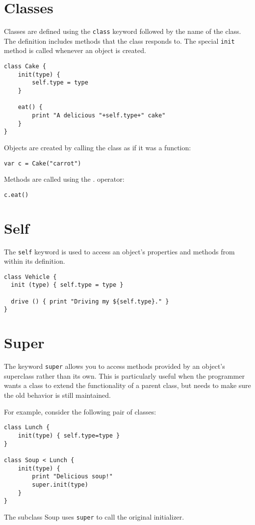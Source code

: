\hypertarget{classes}{%
\section{Classes}\label{classes}}

Classes are defined using the \texttt{class} keyword followed by the
name of the class. The definition includes methods that the class
responds to. The special \texttt{init} method is called whenever an
object is created.

\begin{lstlisting}
class Cake {
    init(type) {
        self.type = type
    }

    eat() {
        print "A delicious "+self.type+" cake"
    }
}
\end{lstlisting}

Objects are created by calling the class as if it was a function:

\begin{lstlisting}
var c = Cake("carrot")
\end{lstlisting}

Methods are called using the . operator:

\begin{lstlisting}
c.eat()
\end{lstlisting}

\hypertarget{self}{%
\section{Self}\label{self}}

The \texttt{self} keyword is used to access an object's properties and
methods from within its definition.

\begin{lstlisting}
class Vehicle {
  init (type) { self.type = type }

  drive () { print "Driving my ${self.type}." }
}
\end{lstlisting}

\hypertarget{super}{%
\section{Super}\label{super}}

The keyword \texttt{super} allows you to access methods provided by an
object's superclass rather than its own. This is particularly useful
when the programmer wants a class to extend the functionality of a
parent class, but needs to make sure the old behavior is still
maintained.

For example, consider the following pair of classes:

\begin{lstlisting}
class Lunch {
    init(type) { self.type=type }
}

class Soup < Lunch {
    init(type) {
        print "Delicious soup!"
        super.init(type)
    }
}
\end{lstlisting}

The subclass Soup uses \texttt{super} to call the original initializer.
